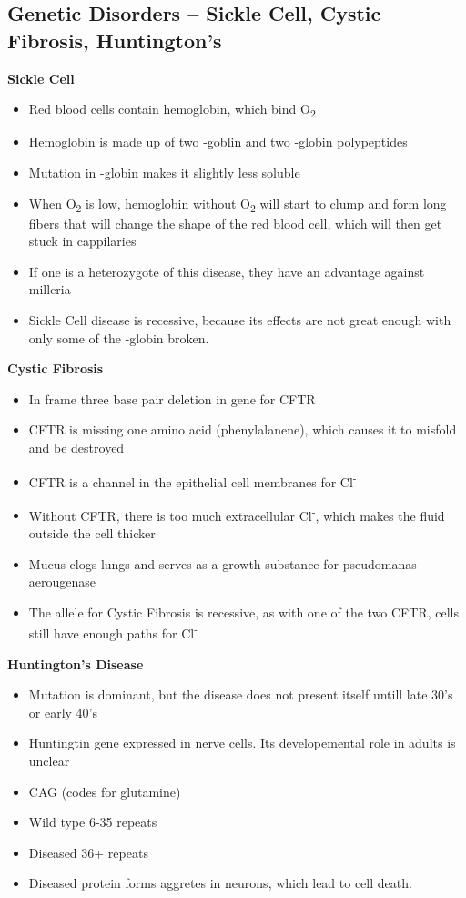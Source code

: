 \documentclass{article}
\begin{document}
\subsection{Genetic Disorders -- Sickle Cell, Cystic Fibrosis, Huntington's}
\textbf{Sickle Cell}
\begin{itemize}
\item Red blood cells contain hemoglobin, which bind O\textsubscript{2}
\item Hemoglobin is made up of two \textalpha -goblin and two \textbeta -globin polypeptides
\item Mutation in \textbeta -globin makes it slightly less soluble
\item When O\textsubscript{2} is low, hemoglobin without O\textsubscript{2} will start to clump and form long fibers that will change the shape of the red blood cell, which will then get stuck in cappilaries
\item If one is a heterozygote of this disease, they have an advantage against milleria
\item Sickle Cell disease is recessive, because its effects are not great enough with only some of the \textbeta -globin broken.
\end{itemize}

\textbf{Cystic Fibrosis}
\begin{itemize}
\item In frame three base pair deletion in gene for CFTR
\item CFTR is missing one amino acid (phenylalanene), which causes it to misfold and be destroyed
\item CFTR is a channel in the epithelial cell membranes for Cl\textsuperscript{-}
\item Without CFTR, there is too much extracellular Cl\textsuperscript{-}, which makes the fluid outside the cell thicker
\item Mucus clogs lungs and serves as a growth substance for pseudomanas aerougenase
\item The allele for Cystic Fibrosis is recessive, as with one of the two CFTR, cells still have enough paths for Cl\textsuperscript{-}
\end{itemize}

\textbf{Huntington's Disease}
\begin{itemize}
\item Mutation is dominant, but the disease does not present itself untill late 30's or early 40's
\item Huntingtin gene expressed in nerve cells. Its developemental role in adults is unclear
\item CAG (codes for glutamine)
\item Wild type 6-35 repeats
\item Diseased 36+ repeats
\item Diseased protein forms aggretes in neurons, which lead to cell death.
\end{itemize}
\end{document}
